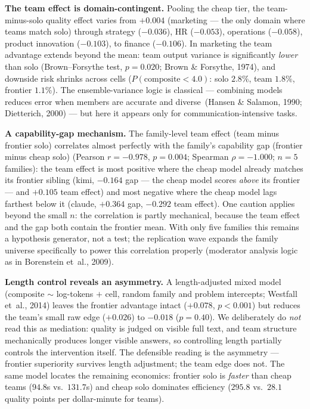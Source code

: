 \documentclass[12pt,a4paper]{article}
\begin{document}
\textbf{The team effect is domain-contingent.} Pooling the cheap tier, the
team-minus-solo quality effect varies from $+0.004$ (marketing --- the only
domain where teams match solo) through strategy ($-0.036$), HR ($-0.053$),
operations ($-0.058$), product innovation ($-0.103$), to finance
($-0.106$). In marketing the team advantage extends beyond the mean: team
output variance is significantly \emph{lower} than solo (Brown--Forsythe test,
$p = 0.020$; Brown \& Forsythe, 1974), and downside risk shrinks across cells
($P(\text{composite} < 4.0)$: solo $2.8\%$, team $1.8\%$, frontier $1.1\%$).
The ensemble-variance logic is classical --- combining models reduces error
when members are accurate and diverse~(Hansen \& Salamon, 1990; Dietterich,
2000) --- but here it appears only for communication-intensive tasks.

\textbf{A capability-gap mechanism.} The family-level team effect (team minus
frontier solo) correlates almost perfectly with the family's capability gap
(frontier minus cheap solo)
(Pearson $r = -0.978$, $p = 0.004$; Spearman $\rho = -1.000$; $n = 5$
families): the team effect is most positive where the cheap model already
matches its frontier sibling (kimi, $-0.164$ gap --- the cheap model scores
\emph{above} its frontier --- and $+0.105$ team effect) and most negative
where the cheap model lags farthest below it (claude, $+0.364$ gap,
$-0.292$ team effect). One caution applies beyond the small $n$: the
correlation is partly mechanical, because the team effect and the gap both
contain the frontier mean. With only five families
this remains a hypothesis generator, not a test; the replication wave expands
the family universe specifically to power this correlation properly
(moderator analysis logic as in Borenstein et~al., 2009).

\textbf{Length control reveals an asymmetry.} A length-adjusted mixed model
(composite $\sim$ log-tokens $+$ cell, random family and problem intercepts;
Westfall et~al., 2014) leaves the frontier advantage intact ($+0.078$,
$p < 0.001$) but reduces the team's small raw edge ($+0.026$) to $-0.018$
($p = 0.40$). We deliberately do \emph{not} read this as mediation: quality is
judged on visible full text, and team structure mechanically produces longer
visible answers, so controlling length partially controls the intervention
itself. The defensible reading is the asymmetry --- frontier superiority
survives length adjustment; the team edge does not. The same model locates the
remaining economics: frontier solo is \emph{faster} than cheap teams ($94.8$s
vs.\ $131.7$s) and cheap solo dominates efficiency ($295.8$ vs.\ $28.1$
quality points per dollar-minute for teams).
\end{document}
